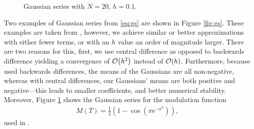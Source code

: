 \begin{figure}[tbp]

\caption[Gaussian series for a particular modulation function.]{Gaussian series with $N = 20$, $h = 0.1$.}
\label{fig:gaussmod}
\end{figure}

Two examples of Gaussian series from \eqref{eq:gs} are shown in Figure \ref{fig:gs}. These examples are taken from \cite{calcaterra2, calcaterra}, however, we achieve similar or better approximations with either fewer terms, or with an $h$ value an order of magnitude larger. There are two reasons for this, first, we use central difference as opposed to backwards difference yielding a convergence of $\bigO{h^2}$ instead of $\bigO{h}$. Furthermore, because \cite{calcaterra2, calcaterra} used backwards differences, the means of the Gaussians are all non-negative, whereas with central differences, our Gaussians' means are both positive and negative---this leads to smaller coefficients, and better numerical stability. Moreover, Figure \ref{fig:gaussmod} shows the Gaussian series for the modulation function
\begin{align*}
M(T) = \frac{1}{2} \left( 1 - \cos \left( \pi \textrm{e}^{-x^2} \right) \right),
\end{align*}
used in \cite{bohun, burgoyneemail}.

